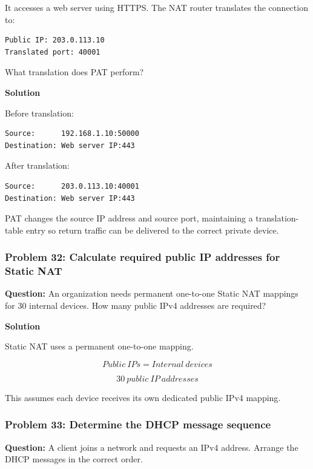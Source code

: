 It accesses a web server using HTTPS. The NAT router translates the connection to:

\begin{lstlisting}
Public IP: 203.0.113.10
Translated port: 40001
\end{lstlisting}

What translation does PAT perform?

\textbf{Solution}

Before translation:

\begin{lstlisting}
Source:      192.168.1.10:50000
Destination: Web server IP:443
\end{lstlisting}

After translation:

\begin{lstlisting}
Source:      203.0.113.10:40001
Destination: Web server IP:443
\end{lstlisting}

PAT changes the source IP address and source port, maintaining a translation-table entry so return traffic can be delivered to the correct private device.

\subsubsection*{Problem 32: Calculate required public IP addresses for Static NAT}

\textbf{Question:} An organization needs permanent one-to-one Static NAT mappings for 30 internal devices. How many public IPv4 addresses are required?

\textbf{Solution}

Static NAT uses a permanent one-to-one mapping.



\[
Public\ IPs=Internal\ devices
\]





\[
\boxed{30\ public\ IP\ addresses}
\]



This assumes each device receives its own dedicated public IPv4 mapping.

\subsubsection*{Problem 33: Determine the DHCP message sequence}

\textbf{Question:} A client joins a network and requests an IPv4 address. Arrange the DHCP messages in the correct order.


